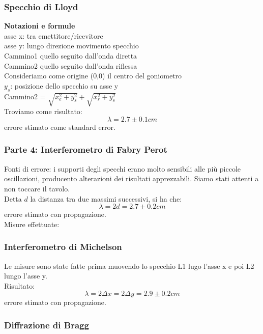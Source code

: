 \subsubsection{Specchio di Lloyd}
    \textbf{Notazioni e formule}\\
    asse x: tra emettitore/ricevitore\\
    asse y: lungo direzione movimento specchio\\
    Cammino1 quello seguito dall'onda diretta\\ Cammino2 quello seguito dall'onda riflessa\\
    Consideriamo come origine (0,0) il centro del goniometro\\
%
    $y_s$: posizione dello specchio su asse y\\
    Cammino2 = 
        $\sqrt{ x^2_e + y^2_s } + \sqrt{ x^2_r + y^2_s }$\\
%
    Troviamo come risultato:\\
    $$\lambda = 2.7 \pm 0.1 cm$$
    errore stimato come standard error.\\
%
    
%
\subsubsection{Parte 4: Interferometro di Fabry Perot}
    Fonti di errore: i supporti degli specchi erano molto sensibili alle più piccole oscillazioni, producento alterazioni dei risultati apprezzabili. Siamo stati attenti a non toccare il tavolo.\\
    Detta $d$ la distanza tra due massimi successivi, si ha che:
        $$ \lambda = 2d = 2.7 \pm 0.2 cm$$
    errore stimato con propagazione.\\
%
    Misure effettuate:\\
    
%
\subsubsection{Interferometro di Michelson}
    Le misure sono state fatte prima muovendo lo specchio L1 lugo l'asse x e poi L2 lungo l'asse y.\\
    
    Risultato:
        $$\lambda = 2\Delta x = 2\Delta y = 2.9 \pm 0.2 cm$$
    errore stimato con propagazione.\\
%
\subsubsection{Diffrazione di Bragg}

